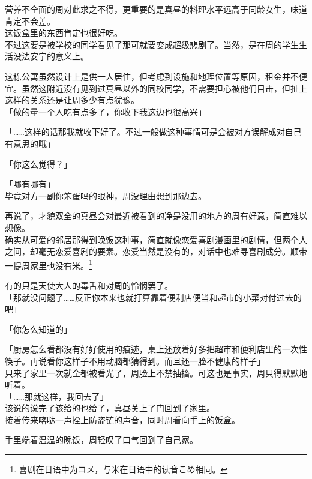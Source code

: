营养不全面的周对此求之不得，更重要的是真昼的料理水平远高于同龄女生，味道肯定不会差。\\

这饭盒里的东西肯定也很好吃。\\

不过这要是被学校的同学看见了那可就要变成超级悲剧了。当然，是在周的学生生活没法安宁的意义上。

这栋公寓虽然设计上是供一人居住，但考虑到设施和地理位置等原因，租金并不便宜。虽然这附近没有见到过真昼以外的同校同学，不需要担心被他们目击，但扯上这样的关系还是让周多少有点犹豫。\\

「做的量一个人吃有点多了，你收下我这边也很高兴」

「……这样的话那我就收下好了。不过一般做这种事情可是会被对方误解成对自己有意思的哦」

「你这么觉得？」

「哪有哪有」\\

毕竟对方一副你笨蛋吗的眼神，周没理由想到那边去。

再说了，才貌双全的真昼会对最近被看到的净是没用的地方的周有好意，简直难以想像。\\

确实从可爱的邻居那得到晚饭这种事，简直就像恋爱喜剧漫画里的剧情，但两个人之间，却毫无恋爱喜剧的要素。恋爱当然是没有的，对话中也难寻喜剧成分。顺带一提周家里也没有米。\footnote{喜剧在日语中为{\jpfont コメ}，与米在日语中的读音{\jpfont こめ}相同。}

有的只是天使大人的毒舌和对周的怜悯罢了。\\

「那就没问题了……反正你本来也就打算靠着便利店便当和超市的小菜对付过去的吧」

「你怎么知道的」

「厨房怎么看都没有好好使用的痕迹，桌上还放着好多把超市和便利店里的一次性筷子。再说看你这样子不用动脑都猜得到。而且还一脸不健康的样子」\\

只来了家里一次就全都被看光了，周脸上不禁抽搐。可这也是事实，周只得默默地听着。\\

「……那就这样，我回去了」\\

该说的说完了该给的也给了，真昼关上了门回到了家里。\\

接着传来喀哒一声拴上防盗链的声音，同时周看向手上的饭盒。

手里端着温温的晚饭，周轻叹了口气回到了自己家。\\

